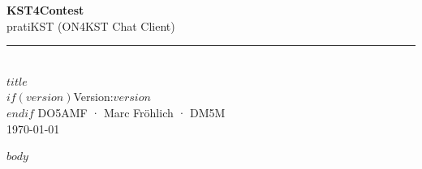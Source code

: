 \documentclass[11pt,a4paper]{article}
\begin{document}
\begin{titlepage}
  \pagecolor{brand-green}
  \centering
  \vspace*{3.5cm}
  {\fontsize{52}{62}\selectfont\bfseries\color{white}KST4Contest}\\[0.4cm]
  {\fontsize{22}{28}\selectfont\color{white!75!brand-green}pratiKST (ON4KST Chat Client)}\\[2.8cm]
  \color{white!40!brand-green}\rule{10cm}{0.6pt}\\[1.8cm]
  {\LARGE\bfseries\color{white}$title$}\\[1cm]
  $if(version)${\large\color{white!80!brand-green}Version:\space$version$}\\[0.6cm]$endif$
  \vfill
  {\large\color{white}DO5AMF · Marc Fröhlich · DM5M}\\[0.4cm]
  {\color{white!70!brand-green}\today}\\[2cm]
\end{titlepage}

\pagecolor{white}
\newpage

\tableofcontents
\newpage

$body$
\end{document}
